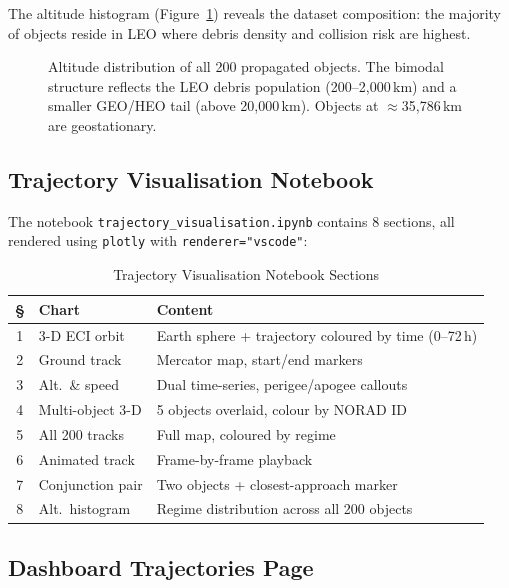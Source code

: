 \documentclass[conference]{IEEEtran}
\begin{document}
The altitude histogram (Figure~\ref{fig:alt_hist}) reveals the dataset
composition: the majority of objects reside in LEO where debris density
and collision risk are highest.

\begin{figure}[H]
  \centering
  \fbox{\rule{0pt}{4cm}\rule{\linewidth}{0pt}}
  \caption{Altitude distribution of all 200 propagated objects.
           The bimodal structure reflects the LEO debris population
           (200--2{,}000\,km) and a smaller GEO/HEO tail (above
           20{,}000\,km). Objects at $\approx$35{,}786\,km are
           geostationary.}
  \label{fig:alt_hist}
\end{figure}

\subsection{Trajectory Visualisation Notebook}

The notebook \texttt{trajectory\_visualisation.ipynb} contains 8 sections,
all rendered using \texttt{plotly} with \texttt{renderer="vscode"}:

\begin{table}[H]
\centering
\caption{Trajectory Visualisation Notebook Sections}
\label{tab:traj_notebook}
\begin{tabular}{clp{4.2cm}}
\toprule
\textbf{\S} & \textbf{Chart} & \textbf{Content} \\
\midrule
1 & 3-D ECI orbit       & Earth sphere + trajectory coloured by time (0--72\,h) \\
2 & Ground track        & Mercator map, start/end markers \\
3 & Alt.\ \& speed      & Dual time-series, perigee/apogee callouts \\
4 & Multi-object 3-D    & 5 objects overlaid, colour by NORAD ID \\
5 & All 200 tracks      & Full map, coloured by regime \\
6 & Animated track      & Frame-by-frame playback \\
7 & Conjunction pair    & Two objects + closest-approach marker \\
8 & Alt.\ histogram     & Regime distribution across all 200 objects \\
\bottomrule
\end{tabular}
\end{table}

\subsection{Dashboard Trajectories Page}
\end{document}
